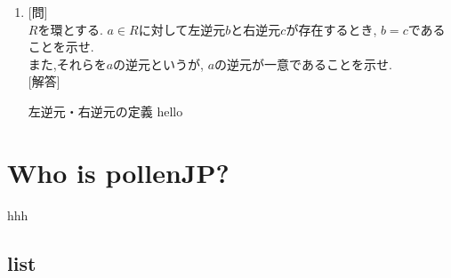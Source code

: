 \documentclass{jsarticle}	       %
\begin{document}
\begin{enumerate}[label=\fbox{\arabic*}]
			\item
				{[問]}\\
					$R$を環とする. $a \in R$に対して左逆元$b$と右逆元$c$が存在するとき, $b=c$であることを示せ.\\
					また,それらを$a$の逆元というが, $a$の逆元が一意であることを示せ.\\
				{[解答]}\\
					\begin{itembox}[l]{左逆元・右逆元の定義}
						hello
					\end{itembox}
		\end{enumerate}

	
	\section{Who is pollenJP?}
		\begin{tcolorbox}
			hhh
		\end{tcolorbox}

		\subsection{list}
\end{document}
